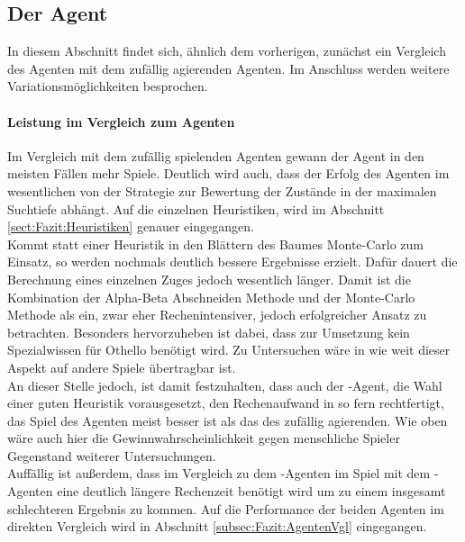 \subsection{Der Agent }
In diesem Abschnitt findet sich, ähnlich dem vorherigen, zunächst ein Vergleich des  Agenten mit dem zufällig agierenden Agenten. Im Anschluss werden weitere Variationsmöglichkeiten besprochen. 
\paragraph{Leistung im Vergleich zum Agenten }
Im Vergleich mit dem zufällig spielenden Agenten gewann der Agent  in den meisten Fällen mehr Spiele. Deutlich wird auch, dass der Erfolg des Agenten im wesentlichen von der Strategie zur Bewertung der Zustände in der maximalen Suchtiefe abhängt. Auf die einzelnen Heuristiken, wird im Abschnitt \ref{sect:Fazit:Heuristiken} genauer eingegangen.
\\Kommt statt einer Heuristik in den Blättern des Baumes Monte-Carlo zum Einsatz, so werden nochmals deutlich bessere Ergebnisse erzielt. Dafür dauert die Berechnung eines einzelnen Zuges jedoch wesentlich länger. Damit ist die Kombination der Alpha-Beta Abschneiden Methode und der Monte-Carlo Methode als ein, zwar eher Rechenintensiver, jedoch erfolgreicher Ansatz zu betrachten. Besonders hervorzuheben ist dabei, dass zur Umsetzung kein Spezialwissen für Othello benötigt wird. Zu Untersuchen wäre in wie weit dieser Aspekt auf andere Spiele übertragbar ist.
\\An dieser Stelle jedoch, ist damit festzuhalten, dass auch der -Agent, die Wahl einer guten Heuristik vorausgesetzt, den Rechenaufwand in so fern rechtfertigt, das Spiel des Agenten meist besser ist als das des zufällig agierenden. Wie oben wäre auch hier die Gewinnwahrscheinlichkeit gegen menschliche Spieler Gegenstand weiterer Untersuchungen.
\\Auffällig ist außerdem, dass im Vergleich zu dem -Agenten im Spiel mit dem -Agenten eine deutlich längere Rechenzeit benötigt wird um zu einem insgesamt schlechteren Ergebnis zu kommen. Auf die Performance der beiden Agenten im direkten Vergleich wird in Abschnitt \ref{subsec:Fazit:AgentenVgl} eingegangen.
